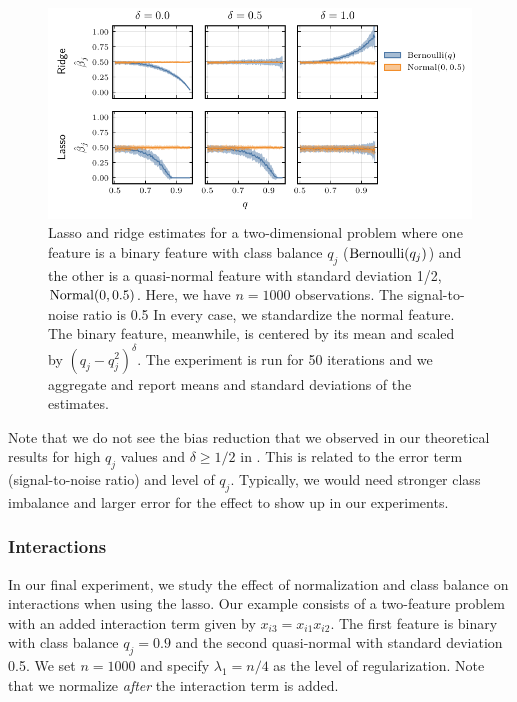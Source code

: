 \begin{figure}[htpb]
  \centering
  \includegraphics{plots/mixed_data.pdf}
  \caption{%
    Lasso and ridge estimates for a two-dimensional problem where one feature is a binary
    feature with class balance \(q_j\) (\(\operatorname{Bernoulli}(q_j)\)) and the other is a quasi-normal
    feature with standard deviation 1/2, \(\operatorname{Normal}(0, 0.5)\). Here, we have \(n = \num{1000}\)
    observations. The signal-to-noise ratio is 0.5 In every case, we standardize the normal
    feature. The binary feature, meanwhile, is centered by its mean and scaled by
    \((q_j-q_j^2)^\delta\). The experiment is run for 50 iterations and we aggregate and report
    means and standard deviations of the estimates.\label{fig:lasso-ridge-comparison}
  }
\end{figure}

Note that we do not see the bias reduction that we observed in our theoretical results for
high \(q_j\) values and \(\delta \geq 1/2\) in . This is
related to the error term (signal-to-noise ratio) and level of \(q_j\). Typically, we would
need stronger class imbalance and larger error for the effect to show up in our
experiments.

\subsubsection{Interactions}\label{sec:experiments-interactions}

In our final experiment, we study the effect of normalization and class balance on
interactions when using the lasso. Our example consists of a two-feature problem with an
added interaction term given by \(x_{i3} = x_{i1}x_{i2}\). The first feature is binary with
class balance \(q_j=0.9\) and the second quasi-normal with standard deviation 0.5. We set
\(n=1000\) and specify \(\lambda_1 = n/4\) as the level of regularization. Note that we
normalize \emph{after} the interaction term is added.

